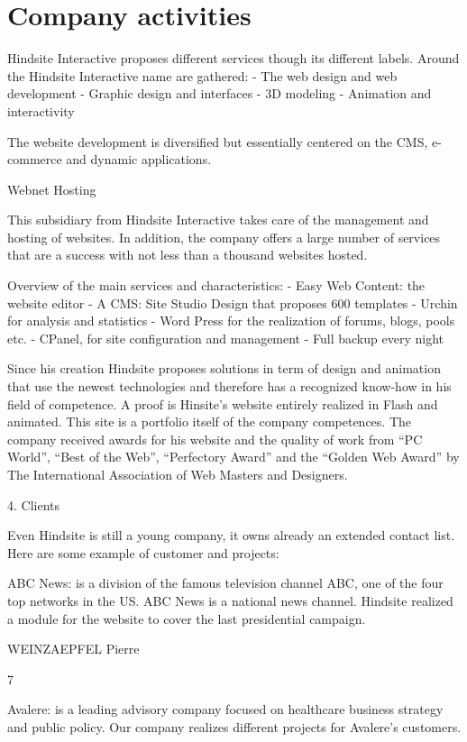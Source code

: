 \section{Company activities}

Hindsite Interactive proposes different services though its different labels.
Around the Hindsite Interactive name are gathered:
- The web design and web development
- Graphic design and interfaces
- 3D modeling
- Animation and interactivity

The website development is diversified but essentially centered on the CMS,
e-commerce and dynamic applications.

Webnet Hosting

This subsidiary from Hindsite Interactive takes care of the management and
hosting of websites. In addition, the company offers a large number of
services that are a success with not less than a thousand websites hosted.

Overview of the main services and characteristics:
- Easy Web Content: the website editor
- A CMS: Site Studio Design that proposes 600 templates
- Urchin for analysis and statistics
- Word Press for the realization of forums, blogs, pools etc.
- CPanel, for site configuration and management
- Full backup every night

Since his creation Hindsite proposes solutions in term of design and animation
that use the newest technologies and therefore has a recognized know-how in
his field of competence.
A proof is Hinsite’s website entirely realized in Flash and animated. This site is
a portfolio itself of the company competences.
The company received awards for his website and the quality of work from
“PC World”, “Best of the Web”, “Perfectory Award” and the “Golden Web
Award” by The International Association of Web Masters and Designers.

4. Clients

Even Hindsite is still a young company, it owns already an extended contact
list. Here are some example of customer and projects:

ABC News: is a division of the famous television channel ABC, one of the
four top networks in the US. ABC News is a national news channel. Hindsite
realized a module for the website to cover the last presidential campaign.

WEINZAEPFEL Pierre

7

Avalere: is a leading advisory company focused on healthcare business
strategy and public policy. Our company realizes different projects for
Avalere’s customers.

